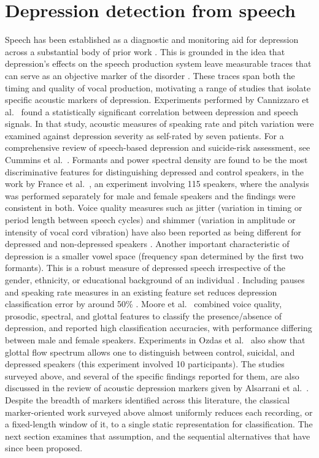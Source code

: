 \documentclass{mproj}
\begin{document}
\section{Depression detection from speech}\label{sec:markers}

Speech has been established as a diagnostic and monitoring aid for depression across a substantial body of prior work \cite{cummins2015acoustic,cummins2015review,cummins2014ivectors,scherer2014audiovisual,williamson2014}. This is grounded in the idea that depression's effects on the speech production system leave measurable traces that can serve as an objective marker of the disorder \cite{morales2016}. These traces span both the timing and quality of vocal production, motivating a range of studies that isolate specific acoustic markers of depression. Experiments performed by Cannizzaro et al.\ \cite{cannizzaro2004} found a statistically significant correlation between depression and speech signals. In that study, acoustic measures of speaking rate and pitch variation were examined against depression severity as self-rated by seven patients. For a comprehensive review of speech-based depression and suicide-risk assessment, see Cummins et al.\ \cite{cummins2015review}. Formants and power spectral density are found to be the most discriminative features for distinguishing depressed and control speakers, in the work by France et al.\ \cite{france2000}, an experiment involving 115 speakers, where the analysis was performed separately for male and female speakers and the findings were consistent in both. Voice quality measures such as jitter (variation in timing or period length between speech cycles) and shimmer (variation in amplitude or intensity of vocal cord vibration) have also been reported as being different for depressed and non-depressed speakers \cite{vicsi2012}. Another important characteristic of depression is a smaller vowel space (frequency span determined by the first two formants). This is a robust measure of depressed speech irrespective of the gender, ethnicity, or educational background of an individual \cite{scherer2016vowel}. Including pauses and speaking rate measures in an existing feature set reduces depression classification error by around 50\% \cite{tao2020}. Moore et al.\ \cite{moore2008} combined voice quality, prosodic, spectral, and glottal features to classify the presence/absence of depression, and reported high classification accuracies, with performance differing between male and female speakers. Experiments in Ozdas et al.\ \cite{ozdas2004} also show that glottal flow spectrum allows one to distinguish between control, suicidal, and depressed speakers (this experiment involved 10 participants). The studies surveyed above, and several of the specific findings reported for them, are also discussed in the review of acoustic depression markers given by Alsarrani et al.\ \cite{alsarrani2025}. Despite the breadth of markers identified across this literature, the classical marker-oriented work surveyed above almost uniformly reduces each recording, or a fixed-length window of it, to a single static representation for classification. The next section examines that assumption, and the sequential alternatives that have since been proposed.
\end{document}
